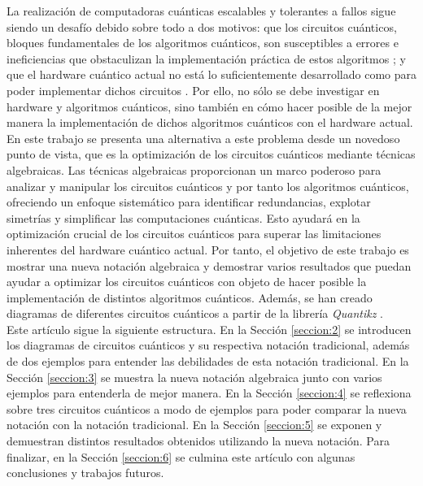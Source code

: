 \documentclass[10pt,conference,a4paper]{IEEEtran}
\begin{document}
La realización de computadoras cuánticas escalables y tolerantes a fallos sigue siendo un desafío debido sobre todo a dos motivos: que los circuitos cuánticos,  bloques fundamentales de los algoritmos cuánticos, son susceptibles a errores e ineficiencias que obstaculizan la implementación práctica de estos algoritmos \cite{error_correction}; y que el hardware cuántico actual no está lo suficientemente desarrollado como para poder implementar dichos circuitos \cite{IBM_hardware}. Por ello, no sólo se debe investigar en   hardware y  algoritmos cuánticos, sino también en cómo hacer posible de la mejor manera la implementación de dichos algoritmos cuánticos con el hardware actual. En este trabajo se presenta una  alternativa a este problema desde un novedoso punto de vista, que es la optimización de los circuitos cuánticos mediante técnicas algebraicas. Las técnicas algebraicas proporcionan un marco poderoso para analizar y manipular los circuitos cuánticos y por tanto los algoritmos cuánticos, ofreciendo un enfoque sistemático para identificar redundancias, explotar simetrías y simplificar las computaciones cuánticas. Esto ayudará en la optimización crucial de los circuitos cuánticos para superar las limitaciones inherentes del hardware cuántico actual. Por tanto, el objetivo de este trabajo es mostrar una nueva notación algebraica y demostrar varios resultados que puedan ayudar a optimizar los circuitos cuánticos con objeto de hacer posible la implementación de distintos algoritmos cuánticos. Además, se han creado diagramas de diferentes circuitos cuánticos a partir de la librería \textit{Quantikz} \cite{quantikz}.\\
Este artículo sigue la siguiente estructura. En la Sección \ref{seccion:2} se introducen los diagramas de circuitos cuánticos y su respectiva notación tradicional, además de dos ejemplos para entender las debilidades de esta notación tradicional. En la Sección \ref{seccion:3} se muestra la nueva notación algebraica junto con varios ejemplos para entenderla de mejor manera. En la Sección \ref{seccion:4} se reflexiona sobre tres circuitos cuánticos a modo de ejemplos para poder comparar la nueva notación con la notación tradicional. En la Sección \ref{seccion:5} se exponen y demuestran distintos resultados obtenidos utilizando la nueva notación. Para finalizar, en la Sección \ref{seccion:6} se culmina este artículo con algunas conclusiones y trabajos futuros.
\end{document}
